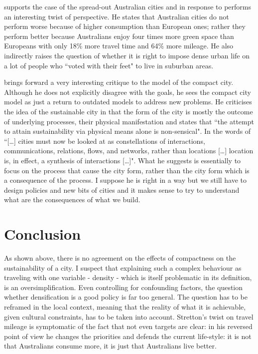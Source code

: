 \documentclass [a4paper,12pt]{article} %
\begin{document}
\cite{Stretton1996} supports the case of the spread-out Australian cities and in response to \cite{newman1992compact} performs an interesting twist of perspective. He states that Australian cities do not perform worse because of higher consumption than European ones; rather they perform better because Australians enjoy four times more green space than Europeans with only 18\% more travel time and 64\% more mileage. He also indirectly raises the question of whether it is right to impose dense urban life on a lot of people who ``voted with their feet" \citep{Neuman2005} to live in suburban areas. 

\cite{Neuman2005} brings forward a very interesting critique to the model of the compact city. Although he does not explicitly disagree with the goals, he sees the compact city model as just a return to outdated models to address new problems. He criticises the idea of the sustainable city in that the form of the city is mostly the outcome of underlying processes, their physical manifestation and states that ``the attempt to attain sustainability via physical means alone is non-sensical". In the words of \cite{batty2013newscience} ``[\ldots] cities must now be looked at as constellations of interactions, communications, relations, flows, and networks, rather than locations [\ldots] location is, in effect, a synthesis of interactions [\ldots]". What he suggests is essentially to focus on the process that cause the city form, rather than the city form which is a consequence of the process. I suppose he is right in a way but we still have to design policies and new bits of cities and it makes sense to try to understand what are the consequences of what we build.


\section*{Conclusion}

As shown above, there is no agreement on the effects of compactness on the sustainability of a city. I suspect that explaining such a complex behaviour as traveling with one variable - density -  which is itself problematic in its definition, is an oversimplification. Even controlling for confounding factors, the question whether densification is a good policy is far too general. The question has to be reframed in the local context, meaning that the reality of what it is achievable, given cultural constraints, has to be taken into account.  Stretton's twist on travel mileage is symptomatic of the fact that not even targets are clear: in his reversed point of view he changes the priorities and defends the current life-style: it is not that Australians consume more, it is just that Australians live better. 
\end{document}
